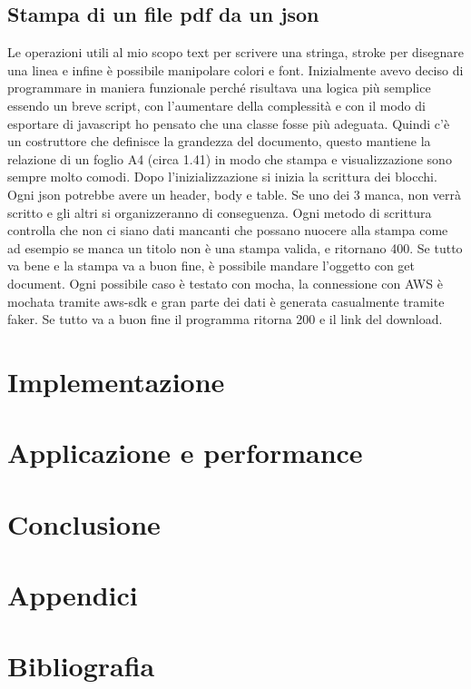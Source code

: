 \documentclass[12pt]{article}
\begin{document}
\subsection{Stampa di un file pdf da un json}
Le operazioni utili al mio scopo text per scrivere una stringa,
stroke per disegnare una linea e infine è possibile manipolare colori e font.
Inizialmente avevo deciso di programmare in maniera funzionale perché risultava
una logica più semplice essendo un breve script, con l'aumentare della complessità
e con il modo di esportare di javascript ho pensato che una classe fosse più adeguata.
Quindi c'è un costruttore che definisce la grandezza del documento, questo mantiene
la relazione di un foglio A4 (circa 1.41) in modo che stampa e visualizzazione sono
sempre molto comodi. Dopo l'inizializzazione si inizia la scrittura dei blocchi.
Ogni json potrebbe avere un header, body e table. Se uno dei 3 manca, non verrà
scritto e gli altri si organizzeranno di conseguenza. Ogni metodo di scrittura
controlla che non ci siano dati mancanti che possano nuocere alla stampa come ad
esempio se manca un titolo non è una stampa valida, e ritornano 400. Se tutto va
bene e la stampa va a buon fine, è possibile mandare l'oggetto con get document.
Ogni possibile caso è testato con mocha, la connessione con AWS è mochata tramite
aws-sdk e gran parte dei dati è generata casualmente tramite faker.
Se tutto va a buon fine il programma ritorna 200 e il link del download.

\section{Implementazione}
\section{Applicazione e performance}
\section{Conclusione}
\section{Appendici}
\section{Bibliografia}
\end{document}
